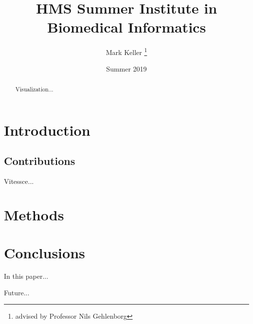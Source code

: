 \documentclass[12pt, letterpaper]{article}
\title{HMS Summer Institute in Biomedical Informatics}
\author{Mark Keller \thanks{advised by Professor Nils Gehlenborg}}
\date{Summer 2019}
\begin{document}
\maketitle

\begin{abstract}
Visualization...
\end{abstract}

\section{Introduction}





\subsection{Contributions}
Vitessce...

\section{Methods}

\section{Conclusions}
In this paper...

Future...

{}

\end{document}
